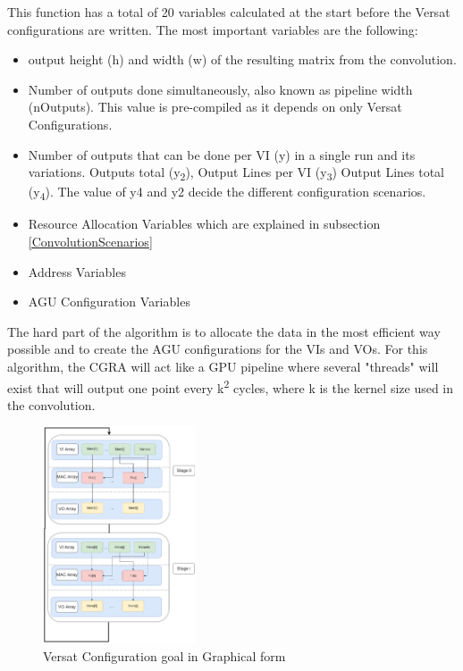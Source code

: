 \documentclass[conference]{IEEEtran}
\begin{document}
This function has a total of 20 variables calculated at the start before the Versat configurations are written. The most important
variables are the following:

\begin{itemize}
	\item output height (h) and width (w) of the resulting matrix from the convolution.
	\item Number of outputs done simultaneously, also known as pipeline width (nOutputs). This value is pre-compiled as it depends on only Versat Configurations.
	\item Number of outputs that can be done per VI (y) in a single run and its variations. Outputs total (y\textsubscript{2}), Output Lines per VI (y\textsubscript{3}) Output Lines total (y\textsubscript{4}).
The value of y4 and y2 decide the different configuration scenarios.
	\item Resource Allocation Variables
which are explained in subsection \ref{ConvolutionScenarios}
	\item Address Variables
	\item AGU Configuration Variables
  \end{itemize}

The hard part of the algorithm is to allocate the data in the most efficient way possible and to create the AGU configurations
for the VIs and VOs. For this algorithm, the CGRA will act like a GPU pipeline where several "threads" will exist
that will output one point every k\textsuperscript{2} cycles, where k is the kernel size used in the convolution.

\begin{figure}[!htbp]
    \centering
    \includegraphics[width=0.4\textwidth]{Figures/Convolution.drawio.png}
    \caption{Versat Configuration goal in Graphical form}
    \label{VersatConfiguration}
\end{figure}
\end{document}
